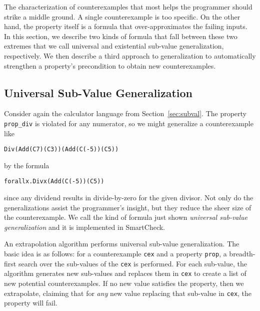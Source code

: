 \documentclass{sigplanconf}
\newenvironment{code}{\begin{alltt}\footnotesize}{\end{alltt}}
\newcommand{\ttp}[1]{\texttt{#1}}
\begin{document}
The characterization of counterexamples that most helps the programmer should
strike a middle ground.  A single counterexample is too specific.  On the other
hand, the property itself is a formula that over-approximates the failing
inputs.  In this section, we describe two kinds of formula that fall between
these two extremes that we call universal and existential sub-value
generalization, respectively.  We then describe a third approach to
generalization to automatically strengthen a property's precondition to obtain
new counterexamples.

\subsection{Universal Sub-Value Generalization}\label{sec:universal}
Consider again the calculator language from Section~\ref{sec:subval}.  The
property \ttp{prop\_div} is violated for any numerator, so we might generalize a
counterexample like
%
\begin{code}
Div (Add (C 7) (C 3)) (Add (C (-5)) (C 5))
\end{code}
%
\noindent
by the formula
%
\begin{code}
forall x . Div x (Add (C (-5)) (C 5))
\end{code}
%
\noindent
since any dividend results in divide-by-zero for the given divisor.  Not only do
the generalizations assist the programmer's insight, but they reduce the sheer
size of the counterexample.  We call the kind of formula just shown
\emph{universal sub-value generalization} and it is implemented in SmartCheck.

An extrapolation algorithm performs universal sub-value generalization.  The
basic idea is as follows: for a counterexample \ttp{cex} and a property
\ttp{prop}, a breadth-first search over the sub-values of the \ttp{cex} is
performed.  For each sub-value, the algorithm generates new sub-values and
replaces them in \ttp{cex} to create a list of new potential counterexamples.
If no new value satisfies the property, then we extrapolate, claiming that for
\emph{any} new value replacing that sub-value in \ttp{cex}, the property will
fail.
\end{document}
